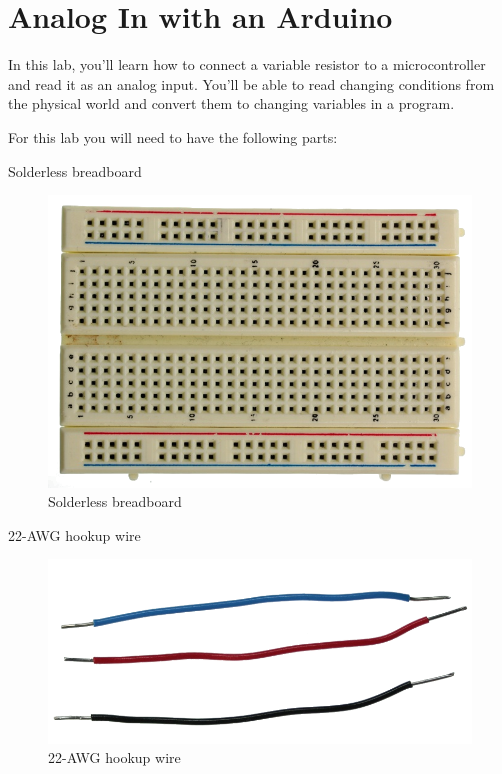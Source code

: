 \chapter{Analog In with an Arduino}

In this lab, you'll learn how to connect a variable resistor to a microcontroller and read it as an analog input. You'll be able to read changing conditions from the physical world and convert them to changing variables in a program.

For this lab you will need to have the following parts:

Solderless breadboard

\begin{figure}[!htb]
 \centering
 \includegraphics[scale=0.3]{img/analogio/breadboard.png}
 \caption{Solderless breadboard}
 \label{Solderless breadboard}
\end{figure}

22-AWG hookup wire

\begin{figure}[!htb]
 \centering
 \includegraphics[scale=0.3]{img/analogio/hookup_wire.png}
 \caption{22-AWG hookup wire}
 \label{22-AWG hookup wire}
\end{figure}

